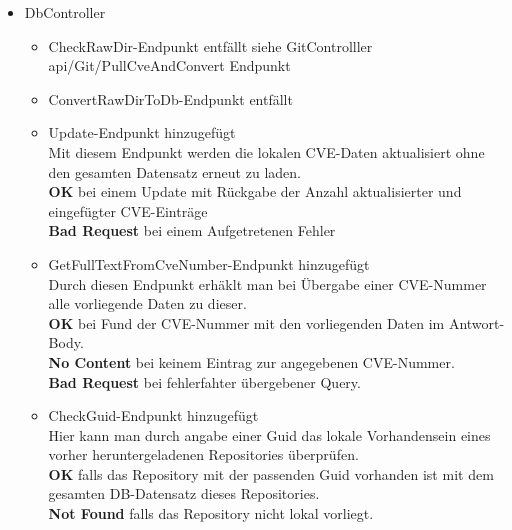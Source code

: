     \begin{itemize}
        \item DbController \label{api_controller:three}\\
            \begin{itemize}
                \item CheckRawDir-Endpunkt entfällt siehe GitControlller api/Git/PullCveAndConvert Endpunkt \\
                \item ConvertRawDirToDb-Endpunkt entfällt \\
                \item Update-Endpunkt hinzugefügt \\
                    Mit diesem Endpunkt werden die lokalen CVE-Daten aktualisiert ohne den gesamten Datensatz erneut zu laden.
                    \\
                    \textbf{OK} bei einem Update mit Rückgabe der Anzahl aktualisierter und eingefügter CVE-Einträge
                    \\
                    \textbf{Bad Request} bei einem Aufgetretenen Fehler
                \item GetFullTextFromCveNumber-Endpunkt hinzugefügt \\
                    Durch diesen Endpunkt erhäklt man bei Übergabe einer CVE-Nummer alle vorliegende Daten zu dieser.
                    \\
                    \textbf{OK} bei Fund der CVE-Nummer mit den vorliegenden Daten im Antwort-Body.
                    \\
                    \textbf{No Content} bei keinem Eintrag zur angegebenen CVE-Nummer. 
                    \\
                    \textbf{Bad Request} bei fehlerfahter übergebener Query.
                \item CheckGuid-Endpunkt hinzugefügt \\
                    Hier kann man durch angabe einer Guid das lokale Vorhandensein eines vorher heruntergeladenen Repositories überprüfen.
                    \\
                    \textbf{OK} falls das Repository mit der passenden Guid vorhanden ist mit dem gesamten DB-Datensatz dieses Repositories.
                    \\
                    \textbf{Not Found} falls das Repository nicht lokal vorliegt.
            \end{itemize}


\end{itemize}
